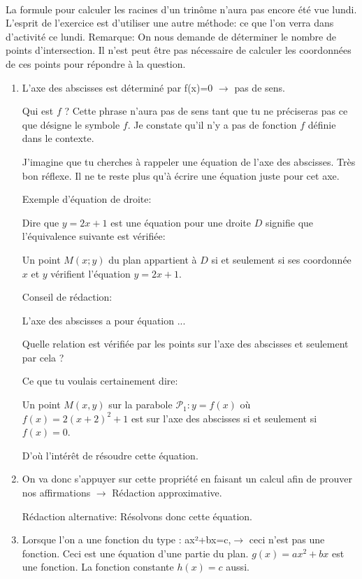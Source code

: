 \documentclass[a4paper,11pt]{article}
\title{}
\author{}
\date{}
\theoremstyle{break}
\newcounter{numero}
\newcommand{\exo}{
  \addtocounter{numero}{1}%
  \textbf{\underline{Exercice \arabic{numero}:}}\quad}
\begin{document}
  \setlength{\unitlength}{1mm}
  \setlength\parindent{0mm}
  
  
  ~
  \medskip
      
  La formule pour calculer les racines d'un trinôme n'aura pas encore été vue lundi. 
  L'esprit de l'exercice est d'utiliser une autre méthode: ce que l'on verra dans
  d'activité ce lundi. Remarque: On nous demande de déterminer le nombre
  de points d'intersection. Il n'est peut être pas nécessaire de 
  calculer les coordonnées de ces points pour répondre à la question.
  
  \begin{enumerate}
    \item
 L’axe des abscisses est déterminé par f(x)=0 $\to$ pas de sens.

Qui est $f$ ? Cette phrase n'aura pas de sens tant que tu ne préciseras pas ce que 
désigne le symbole $f$. Je constate qu'il n'y a pas de fonction $f$ 
définie dans le contexte.

J'imagine que tu cherches à rappeler une équation de l'axe des abscisses. Très bon réflexe.
Il ne te reste plus qu'à écrire une équation juste pour cet axe. 

Exemple d'équation de droite:

Dire que $y=2x+1$ est une équation pour une droite $D$ signifie que l'équivalence suivante est 
vérifiée:

Un point $M(x;y)$ du plan appartient à $D$ si et seulement si ses coordonnée $x$ et $y$
vérifient l'équation $y=2x+1$.

Conseil de rédaction:

L'axe des abscisses a pour équation ...

Quelle relation est vérifiée par les points sur l'axe des abscisses et seulement par cela ?

Ce que tu voulais certainement dire:

Un point $M(x,y)$ sur la parabole $\mathcal{P}_1:y=f(x)$ où $f(x)=2(x+2)^2+1$ est
sur l'axe des abscisses si et seulement si $f(x)=0$.

D'où l’intérêt de résoudre cette équation.

\item
 On va donc s’appuyer sur cette propriété en faisant un calcul afin de prouver nos 
 affirmations $\to$ Rédaction approximative.
 
 Rédaction alternative: Résolvons donc cette équation.

\item Lorsque l’on a une fonction du type : ax²+bx=c,$\to$ ceci n'est pas une fonction.
Ceci est une équation d'une partie du plan. $g(x)=ax^2+bx$ est une fonction. La fonction constante $h(x)=c$ aussi.


\end{enumerate}
\end{document}
